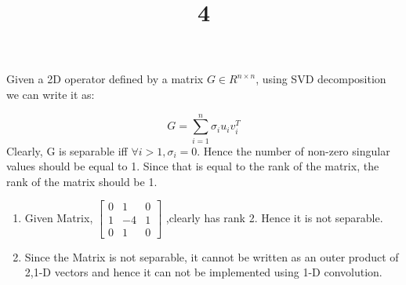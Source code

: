 \documentclass[a4paper]{article}
\title{4}
\date{}
\begin{document}
\maketitle


Given a 2D operator defined by a matrix $G \in R^{n\times n}$, using SVD decomposition we can write it as:

\begin{equation}
    G = \sum_{i = 1}^{n} \sigma_{i}u_{i}v_{i}^T
\end{equation}
Clearly, G is separable iff $\forall i > 1, \sigma_i = 0$.
Hence the number of non-zero singular values should be equal to 1. Since that is equal to the rank of the matrix, the rank of the matrix should be 1.

\begin{enumerate}[label=(\alph*)]
    \item Given Matrix,
$
\begin{bmatrix}

    0 & 1 & 0 \\
    1 & -4 & 1\\
    0 & 1 & 0 
    
\end{bmatrix}
$
,clearly has rank 2. Hence it is not separable.

\item Since the Matrix is not separable, it cannot be written as an outer product of 2,1-D vectors and hence it can not be implemented using 1-D convolution.

\end{enumerate}
\end{document}
